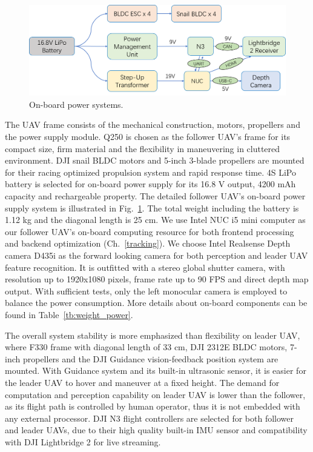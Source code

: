 \begin{figure}[ht]
  \centering
  \includegraphics[width=1.0\textwidth]{figure/chapter_4/power_system.png}
  \caption{On-board power systems.}
  \label{fig:power_systems}
\end{figure}

The UAV frame consists of the mechanical construction, motors, propellers and the power supply module. Q250 is chosen as the follower UAV's frame for its compact size, firm material and the flexibility in maneuvering in cluttered environment. DJI snail BLDC motors and 5-inch 3-blade propellers are mounted for their racing optimized propulsion system and rapid response time. 4S LiPo battery is selected for on-board power supply for its 16.8 V output, 4200 mAh capacity and rechargeable property. The detailed follower UAV's on-board power supply system is illustrated in Fig.~\ref{fig:power_systems}. The total weight including the battery is 1.12 kg and the diagonal length is 25 cm. We use Intel NUC i5 mini computer as our follower UAV's on-board computing resource for both frontend processing and backend optimization (Ch.~\ref{tracking}). We choose Intel Realsense Depth camera D435i as the forward looking camera for both perception and leader UAV feature recognition. It is outfitted with a stereo global shutter camera, with resolution up to 1920x1080 pixels, frame rate up to 90 FPS and direct depth map output. With sufficient tests, only the left monocular camera is employed to balance the power consumption. More details about on-board components can be found in Table~\ref{tb:weight_power}.

The overall system stability is more emphasized than flexibility on leader UAV, where F330 frame with diagonal length of 33 cm, DJI 2312E BLDC motors, 7-inch propellers and the DJI Guidance vision-feedback position system are mounted. With Guidance system and its built-in ultrasonic sensor, it is easier for the leader UAV to hover and maneuver at a fixed height. The demand for computation and perception capability on leader UAV is lower than the follower, as its flight path is controlled by human operator, thus it is not embedded with any external processor. DJI N3 flight controllers are selected for both follower and leader UAVs, due to their high quality built-in IMU sensor and compatibility with DJI Lightbridge 2 for live streaming.

